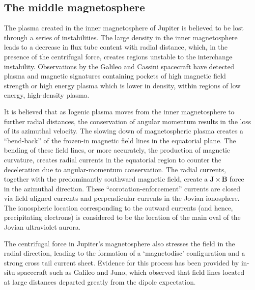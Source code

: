 \subsection{The middle magnetosphere}
The plasma created in the inner magnetosphere of Jupiter is believed to be lost through a series of instabilities. The large density in the inner magnetosphere leads to a decrease in flux tube content with radial distance, which, in the presence of the centrifugal force, creates regions unstable to the interchange instability. Observations by the Galileo and Cassini spacecraft have detected plasma and magnetic signatures containing pockets of high magnetic field strength or high energy plasma which is lower in density, within regions of low energy, high-density plasma. 

It is believed that as Iogenic plasma moves from the inner magnetosphere to further radial distances, the conservation of angular momentum results in the loss of its azimuthal velocity. The slowing down of magnetospheric plasma creates a ``bend-back'' of the frozen-in magnetic field lines in the equatorial plane. The bending of these field lines, or more accurately, the production of magnetic curvature, creates radial currents in the equatorial region to counter the deceleration due to angular-momentum conservation. The radial currents, together with the predominantly southward magnetic field, create a $\mathbf{J}\times\mathbf{B}$ force in the azimuthal direction. These ``corotation-enforcement'' currents are closed via field-aligned currents and perpendicular currents in the Jovian ionosphere. The ionospheric location corresponding to the outward currents (and hence, precipitating electrons) is considered to be the location of the main oval of the Jovian ultraviolet aurora.

The centrifugal force in Jupiter's magnetosphere also stresses the field in the radial direction, leading to the formation of a `magnetodisc' configuration and a strong cross tail current sheet. Evidence for this process has been provided by in-situ spacecraft such as Galileo and Juno, which observed that field lines located at large distances departed greatly from the dipole expectation. 

